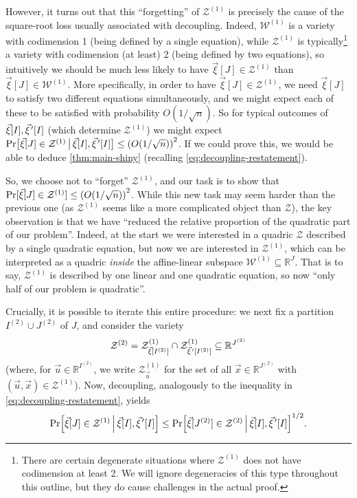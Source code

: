 \documentclass[english]{article}
\theoremstyle{remark}
\numberwithin{equation}{section}
\numberwithin{figure}{section}
\newcommand{\pvec}[1]{\vec{#1}\mkern2mu\vphantom{#1}'}
\newcommand{\su}{\subseteq}
\newcommand{\RR}{\mathbb{R}}
\newcommand{\mc}{\mathcal}
\let\originalleft\left
\let\originalright\right
\renewcommand{\left}{\mathopen{}\mathclose\bgroup\originalleft}
\renewcommand{\right}{\aftergroup\egroup\originalright}
\begin{document}
However, it turns out that this ``forgetting'' of $\mathcal{Z}^{(1)}$ is
precisely the cause of the square-root loss usually associated
with decoupling. Indeed, $\mathcal W^{(1)}$ is a variety with codimension
1 (being defined by a single equation), while $\mathcal{Z}^{(1)}$ is typically\footnote{There are certain degenerate situations where $\mc Z^{(1)}$ does not have codimension at least 2. We will ignore degeneracies of this type throughout this outline, but they do cause challenges in the actual proof.} a variety with codimension (at least) 
2 (being defined by two equations), so
intuitively we should be much less likely to have $\vec{\xi}[J]\in\mathcal{Z}^{(1)}$
than $\vec{\xi}[J]\in\mathcal{W}^{(1)}$. More specifically, in order to have $\vec{\xi}[J]\in\mathcal{Z}^{(1)}$,
we need $\vec{\xi}[J]$ to satisfy two different equations simultaneously, and we might expect each of these to be satisfied with probability $O(1/\sqrt n)$. So for typical
outcomes of $\vec \xi[I],\pvec \xi[I]$ (which determine $\mc Z^{(1)}$) we might expect $\Pr\bigl[\vec{\xi}[J]\in\mathcal{Z}^{(1)}\,\big|\,\vec \xi[I],\pvec \xi[I]\bigr]\le\left(O(1/\sqrt{n})\right)^{2}$. If we could prove this, we would be able to deduce \cref{thm:main-shiny} (recalling \cref{eq:decoupling-restatement}).

So, we choose not to ``forget'' $\mathcal{Z}^{(1)}$, and our task
is to show that $\Pr[\vec{\xi}[J]\in\mathcal{Z}^{(1)}]\le\left(O(1/\sqrt{n})\right)^{2}$.
While this new task may seem harder than the previous one (as $\mathcal{Z}^{(1)}$ seems like a more complicated object than $\mathcal{Z}$), the key observation is that we have ``reduced the relative proportion
of the quadratic part of our problem''. Indeed, at the start we were interested in a
quadric $\mathcal{Z}$ described by a single quadratic equation, but now we are interested in $\mathcal{Z}^{(1)}$, which can be interpreted as a quadric \emph{inside} the affine-linear subspace $\mathcal{W}^{(1)}\subseteq \RR^J$. That is to say, $\mathcal{Z}^{(1)}$ is described by one linear and one quadratic equation, so now ``only half of our problem is quadratic''.

Crucially, it is possible to iterate this entire procedure: we next fix a partition
$I^{(2)}\cup J^{(2)}$ of $J$, and consider the variety
\[\mathcal{Z}^{(2)}=\mathcal{Z}^{(1)}_{\vec \xi[I^{(2)}]}\cap\mathcal{Z}^{(1)}_{\pvec\xi[I^{(2)}]}\su \RR^{J^{(2)}}\]
(where, for $\vec u\in \RR^{I^{(2)}}$, we write $\mc Z^{(1)}_{\vec u}$ for the set of all $\vec x\in \RR^{J^{(2)}}$ with $(\vec u,\vec x)\in \mc Z^{(1)}$). Now, decoupling, analogously to the inequality in \cref{eq:decoupling-restatement}, yields
\begin{equation}\Pr\Bigl[\vec \xi[J]\in \mc Z^{(1)}\,\Big|\,\vec \xi[I],\pvec \xi[I]\Bigr]\le \Pr\Bigl[\vec \xi[J^{(2)}]\in \mc Z^{(2)}\,\Big|\,\vec \xi[I],\pvec \xi[I]\Bigr]^{1/2}.\label{eq:decoupling-illustration-2}\end{equation}
\end{document}
